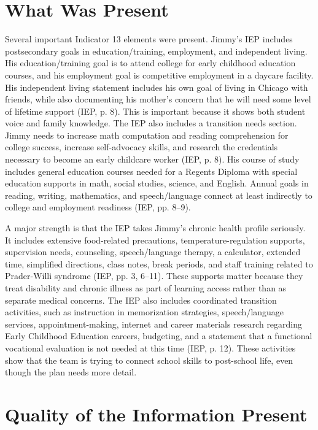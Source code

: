 \documentclass[11pt]{article}
\begin{document}
\section{What Was Present}

Several important Indicator 13 elements were present. Jimmy's IEP includes postsecondary goals in education/training, employment, and independent living. His education/training goal is to attend college for early childhood education courses, and his employment goal is competitive employment in a daycare facility. His independent living statement includes his own goal of living in Chicago with friends, while also documenting his mother's concern that he will need some level of lifetime support (IEP, p. 8). This is important because it shows both student voice and family knowledge. The IEP also includes a transition needs section. Jimmy needs to increase math computation and reading comprehension for college success, increase self-advocacy skills, and research the credentials necessary to become an early childcare worker (IEP, p. 8). His course of study includes general education courses needed for a Regents Diploma with special education supports in math, social studies, science, and English. Annual goals in reading, writing, mathematics, and speech/language connect at least indirectly to college and employment readiness (IEP, pp. 8--9).

A major strength is that the IEP takes Jimmy's chronic health profile seriously. It includes extensive food-related precautions, temperature-regulation supports, supervision needs, counseling, speech/language therapy, a calculator, extended time, simplified directions, class notes, break periods, and staff training related to Prader-Willi syndrome (IEP, pp. 3, 6--11). These supports matter because they treat disability and chronic illness as part of learning access rather than as separate medical concerns. The IEP also includes coordinated transition activities, such as instruction in memorization strategies, speech/language services, appointment-making, internet and career materials research regarding Early Childhood Education careers, budgeting, and a statement that a functional vocational evaluation is not needed at this time (IEP, p. 12). These activities show that the team is trying to connect school skills to post-school life, even though the plan needs more detail.

\section{Quality of the Information Present}
\end{document}
